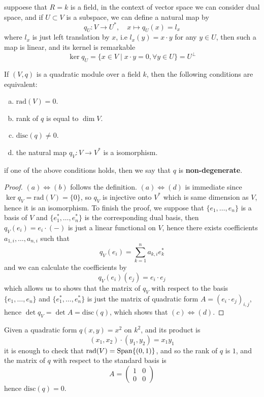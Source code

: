 suppoese that \(R = k\) is a field, in the context of vector space we can consider dual space, and if \(U \subset V\) is a subspace, we can define a natural map by
\[q_U : V \to U^*, \quad x \mapsto q_U(x) = l_x\]
where \(l_x\) is just left translation by \(x\), i.e \(l_x(y) = x \cdot y\) for any \(y \in U\), then such a map is linear, and its kernel is remarkable 
\[\ker q_U = \{x \in V \mid x \cdot y = 0 , \forall y \in U\} = U^\perp\]

\begin{colorlemma}
If \((V,q)\) is a quadratic module over a field \(k\), then the following conditions are equivalent:
\begin{enumerate}[(a)]
    \item \(\mathrm{rad}(V) = 0\).
    \item rank of \(q\) is equal to \(\dim V\). 
    \item \(\mathrm{disc}(q) \neq 0\).
    \item the natural map \(q_V: V \to V^*\) is a isomorphism.
\end{enumerate}
if one of the above conditions holds, then we say that \(q\) is \textbf{non-degenerate}.
\end{colorlemma}

\begin{proof}
    \((a) \iff (b)\) follows the definition. \((a) \iff (d)\) is immediate since \(\ker q_V = \mathrm{rad}(V) = \{0\}\), so \(q_V\) is injective onto \(V^*\) which is same dimension as \(V\), hence it is an isomorphism. To finish the proof, we suppose that \(\{e_1,\dots,e_n\}\) is a basis of \(V\) and \(\{e_1^*,\dots,e_n^*\}\) is the corresponding dual basis, then \(q_V(e_i) = e_i \cdot (-)\) is just a linear functional on \(V\), hence there exists coefficients \(a_{1,i},\dots,a_{n,i}\) such that 
    \[q_V(e_i) = \sum_{k=1}^n a_{k,i} e_k^*\]
    and we can calculate the coefficients by
    \[q_V(e_i)(e_j) = e_i \cdot e_j\]
    which allows us to shows that the matrix of \(q_V\) with respect to the basis \(\{e_1,\dots,e_n\}\) and \(\{e_1^*,\dots,e_n^*\}\) is just the matrix of quadratic form \(A = (e_i \cdot e_j)_{i,j}\), hence \(\det q_V = \det A = \mathrm{disc}(q)\), which shows that \((c) \iff (d)\).
\end{proof}

\begin{example}
    Given a quadratic form \(q(x,y) = x^2\) on \(k^2\), and its product is 
    \[(x_1,x_2) \cdot (y_1,y_2) = x_1y_1\]
    it is enough to check that \(\operatorname{rad}(V) = \mathrm{Span} \{(0,1)\}\), and so the rank of \(q\) is \(1\), and the matrix of \(q\) with respect to the standard basis is
    \[A = \begin{pmatrix}1 & 0 \\ 0 & 0\end{pmatrix}\]
    hence \(\mathrm{disc}(q) = 0\).
\end{example}

